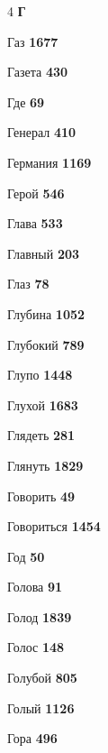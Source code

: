 \begin{multicols}{4}
\vspace{0.6em}\noindent\textbf{\normalsize\sffamily\color{primary} Г}\par\vspace{0.2em}
\noindent Газ \dotfill \textbf{\color{secondary} 1677}\par
\noindent Газета \dotfill \textbf{\color{secondary} 430}\par
\noindent Где \dotfill \textbf{\color{secondary} 69}\par
\noindent Генерал \dotfill \textbf{\color{secondary} 410}\par
\noindent Германия \dotfill \textbf{\color{secondary} 1169}\par
\noindent Герой \dotfill \textbf{\color{secondary} 546}\par
\noindent Глава \dotfill \textbf{\color{secondary} 533}\par
\noindent Главный \dotfill \textbf{\color{secondary} 203}\par
\noindent Глаз \dotfill \textbf{\color{secondary} 78}\par
\noindent Глубина \dotfill \textbf{\color{secondary} 1052}\par
\noindent Глубокий \dotfill \textbf{\color{secondary} 789}\par
\noindent Глупо \dotfill \textbf{\color{secondary} 1448}\par
\noindent Глухой \dotfill \textbf{\color{secondary} 1683}\par
\noindent Глядеть \dotfill \textbf{\color{secondary} 281}\par
\noindent Глянуть \dotfill \textbf{\color{secondary} 1829}\par
\noindent Говорить \dotfill \textbf{\color{secondary} 49}\par
\noindent Говориться \dotfill \textbf{\color{secondary} 1454}\par
\noindent Год \dotfill \textbf{\color{secondary} 50}\par
\noindent Голова \dotfill \textbf{\color{secondary} 91}\par
\noindent Голод \dotfill \textbf{\color{secondary} 1839}\par
\noindent Голос \dotfill \textbf{\color{secondary} 148}\par
\noindent Голубой \dotfill \textbf{\color{secondary} 805}\par
\noindent Голый \dotfill \textbf{\color{secondary} 1126}\par
\noindent Гора \dotfill \textbf{\color{secondary} 496}\par

\end{multicols}
